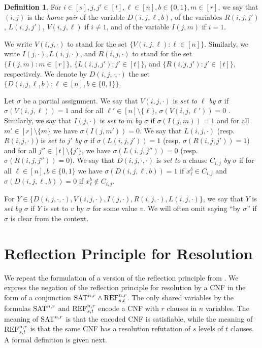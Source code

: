\documentclass[10pt,a4paper]{article}
\theoremstyle{remark}
\newtheorem*{switching lemma}{Switching Lemma}
\newtheorem*{open problem}{Open Problem}
\theoremstyle{definition}
\newtheorem{definition}[theorem]{Definition}
\begin{document}
\begin{definition}
\label{def:home-pair-and-set-to}
For $i \in [s], j,j' \in [t], \ell \in [n], b \in \{0,1\}, m \in [r]$, we say that $(i,j)$ is the \emph{home pair} of the variable $D(i,j,\ell,b)$, of the variables $R(i,j,j')$, $L(i,j,j')$, $V(i,j,\ell)$ if $i \neq 1$, and of the variable $I(j,m)$ if $i=1$.

We write $V(i,j,\cdot)$ to stand for the set $\{V(i,j,\ell) : \ell \in [n] \}$. Similarly, we write $I(j,\cdot), L(i,j,\cdot)$, and $R(i,j,\cdot)$ to stand for the set $\{I(j,m) : m \in [r]\}$, $\{L(i,j,j') : j' \in [t]\}$, and $\{R(i,j,j') : j' \in [t]\}$, respectively. We denote by $D(i,j,\cdot,\cdot)$ the set $\{D(i,j,\ell,b) : \ell \in [n], b \in \{0,1\}\}$. 

Let $\sigma$ be a partial assignment. We say that $V(i,j,\cdot)$ is \emph{set to} $\ell$ \emph{by} $\sigma$ if $\sigma(V(i,j,\ell)) = 1$ and for all $\ell' \in [n] \! \setminus \{\ell\}$, $\sigma(V(i,j,\ell')) = 0$ . Similarly, we say that $I(j,\cdot)$ is \emph{set to} $m$ \emph{by} $\sigma$ if $\sigma(I(j,m)) = 1$ and for all $m' \in [r]\! \setminus \! \{m\}$ we have $\sigma(I(j,m')) = 0$.
We say that $L(i,j,\cdot)$ (resp. $R(i,j,\cdot)$)   is \emph{set to} $j'$ \emph{by} $\sigma$ if $\sigma(L(i,j,j')) = 1$ (resp. $\sigma(R(i,j,j')) = 1$) and for all $j'' \in [t] \! \setminus \! \{j'\}$,  we have $\sigma(L(i,j,j'')) = 0$ (resp. $\sigma(R(i,j,j'')) = 0$). 
We say that $D(i,j,\cdot, \cdot)$ is \emph{set to} a clause $C_{i,j}$ \emph{by} $\sigma$ if for all $\ell \in [n], b \in \{0,1\}$ we have $\sigma(D(i,j,\ell,b)) = 1$ if $x_\ell^b \in C_{i,j}$ and $\sigma(D(i,j,\ell,b)) = 0$ if $x_\ell^b \not \in C_{i,j}$. 

For $Y \in \{D(i,j,\cdot,\cdot), V(i,j,\cdot), I(j,\cdot), R(i,j,\cdot), L(i,j,\cdot)\}$, we say that $Y$ is \emph{set by} $\sigma$ if $Y$ is set to $v$ by $\sigma$ for some value $v$. We will often omit saying ``by $\sigma$'' if $\sigma$ is clear from the context.
\end{definition}




\section{Reflection Principle for Resolution}
\label{sec:refl-princ-for-res}
We repeat the formulation of a version of the reflection principle from \cite{Garlik2019-mfcs}.
We express the negation of the reflection principle for resolution by a CNF in the form of a conjunction $\textnormal{SAT}^{n,r} \land \textnormal{REF}^{n,r}_{s,t}$. The only shared variables by the formulas $\textnormal{SAT}^{n,r}$ and $\textnormal{REF}^{n,r}_{s,t}$ encode a CNF with $r$ clauses in $n$ variables. The meaning of $\textnormal{SAT}^{n,r}$ is that the encoded CNF is satisfiable, while the meaning of $\textnormal{REF}^{n,r}_{s,t}$ is that the same CNF has a resolution refutation of $s$ levels of $t$ clauses. A formal definition is given next.
\end{document}
